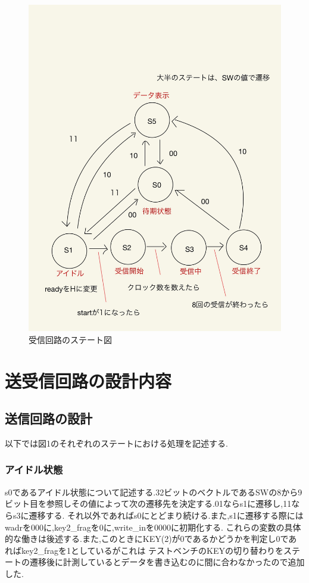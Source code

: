 \documentclass[dvipdfmx]{jarticle}
\begin{document}
\begin{figure}[h]
\begin{minipage}[b]{0.45\linewidth}
      \includegraphics[keepaspectratio, scale=0.1]{state_receive.jpg}
      \caption{受信回路のステート図}
    \end{minipage}
  \end{figure}
\section{送受信回路の設計内容}
\subsection{送信回路の設計}
以下では図1のそれぞれのステートにおける処理を記述する.
\subsubsection{アイドル状態}
s0であるアイドル状態について記述する.32ビットのベクトルであるSWの8から9ビット目を参照しその値によって次の遷移先を決定する.01ならs1に遷移し,11ならs3に遷移する.
それ以外であればs0にとどまり続ける.また,s1に遷移する際にはwadrを000に,key2\_fragを0に,write\_inを0000に初期化する.
これらの変数の具体的な働きは後述する.また,このときにKEY(2)が0であるかどうかを判定し0であればkey2\_fragを1としているがこれは
テストベンチのKEYの切り替わりをステートの遷移後に計測しているとデータを書き込むのに間に合わなかったので追加した.
\end{document}
